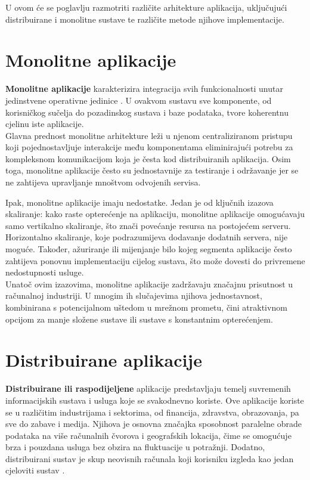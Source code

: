 \documentclass[times, utf8, diplomski]{fer}
\begin{document}
U ovom će se poglavlju razmotriti različite arhitekture aplikacija, uključujući distribuirane i monolitne sustave te različite metode njihove implementacije.


\section{Monolitne aplikacije}
\label{sec:monolith}

\textbf{Monolitne aplikacije} karakterizira integracija svih funkcionalnosti unutar jedinstvene operativne jedinice \citep{harris_microservices_2023}. U ovakvom sustavu sve komponente, od korisničkog sučelja do pozadinskog sustava i baze podataka, tvore koherentnu cjelinu iste aplikacije. \\

Glavna prednost monolitne arhitekture leži u njenom centraliziranom pristupu koji pojednostavljuje interakcije među komponentama eliminirajući potrebu za kompleksnom komunikacijom koja je česta kod distribuiranih aplikacija. Osim toga, monolitne aplikacije često su jednostavnije za testiranje i održavanje jer se ne zahtijeva upravljanje mnoštvom odvojenih servisa. 

Ipak, monolitne aplikacije imaju nedostatke. Jedan je od ključnih izazova skaliranje: kako raste opterećenje na aplikaciju, monolitne aplikacije omogućavaju samo vertikalno skaliranje, što znači povećanje resursa na postojećem serveru. Horizontalno skaliranje, koje podrazumijeva dodavanje dodatnih servera, nije moguće. Također, ažuriranje ili mijenjanje bilo kojeg segmenta aplikacije često zahtijeva ponovnu implementaciju  cijelog sustava, što može dovesti do privremene nedostupnosti usluge. \\

Unatoč ovim izazovima, monolitne aplikacije zadržavaju značajnu prisutnost u računalnoj industriji. U mnogim ih slučajevima njihova jednostavnost, kombinirana s potencijalnom uštedom u mrežnom prometu, čini atraktivnom opcijom za manje složene sustave ili sustave s konstantnim opterećenjem.


\section{Distribuirane aplikacije}
\label{sec:distributed}

\textbf{Distribuirane ili raspodijeljene} aplikacije predstavljaju temelj suvremenih informacijskih sustava i usluga koje se svakodnevno koriste. Ove aplikacije koriste se u različitim industrijama i sektorima, od financija, zdravstva, obrazovanja, pa sve do zabave i medija. Njihova je osnovna značajka sposobnost paralelne obrade podataka na više računalnih čvorova i geografskih lokacija, čime se omogućuje brza i pouzdana usluga bez obzira na fluktuacije u potražnji. Dodatno, distribuirani sustav je skup neovisnih računala koji korisniku izgleda kao jedan cjeloviti sustav \citep{tanenbaum_distributed_2007}.\\
\end{document}
